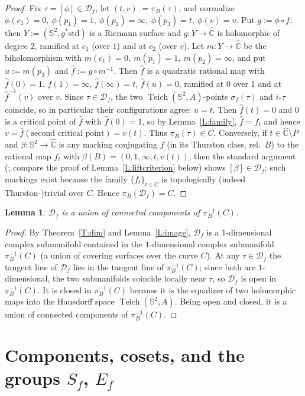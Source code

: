 \documentclass[11pt]{amsart}
\newtheorem{lemma}[theorem]{Lemma}
\newcommand{\Sph}{\mathbb{S}^{2}}
\newcommand{\Cpt}{\widehat{\mathbb{C}}}
\newcommand{\Teich}{\operatorname{Teich}}
\newcommand{\Def}{\mathcal{D}}
\begin{document}
\begin{proof}
Fix $\tau=[\phi]\in\Def_f$, let $(t,v):=\pi_B(\tau)$, and normalize
$\phi(c_1)=0,\ \phi(p_1)=1,\ \phi(p_2)=\infty,\ \phi(p_3)=t,\
\phi(v)=v$. Put $g:=\phi\circ f$; then $Y:=(\Sph,g^*\text{std})$ is a
Riemann surface and $g:Y\to\Cpt$ is holomorphic of degree $2$, ramified at
$c_1$ (over $1$) and at $c_2$ (over $v$). Let $m:Y\to\Cpt$ be the
biholomorphism with $m(c_1)=0,\ m(p_1)=1,\ m(p_2)=\infty$, and put
$u:=m(p_3)$ and $\hat f:=g\circ m^{-1}$. Then $\hat f$ is a quadratic
rational map with $\hat f(0)=1$, $\hat f(1)=\infty$, $\hat f(\infty)=t$,
$\hat f(u)=0$, ramified at $0$ over $1$ and at
$\hat f^{-1}(v)$ over $v$. Since $\tau\in\Def_f$, the two
$\Teich(\Sph,A)$-points $\sigma_f(\tau)$ and $i_*\tau$ coincide, so in
particular their configurations agree: $u=t$. Then $\hat f(t)=0$ and $0$
is a critical point of $\hat f$ with $\hat f(0)=1$, so by
Lemma~\ref{L:family}, $\hat f=f_t$ and hence
$v=\hat f(\text{second critical point})=v(t)$. Thus
$\pi_B(\tau)\in C$. Conversely, if $t\in\Cpt\setminus P$ and $\beta:
\Sph\to\Cpt$ is any marking conjugating $f$ (in its Thurston class, rel.\
$B$) to the rational map $f_t$ with $\beta(B)=(0,1,\infty,t,v(t))$,
then the standard argument
(\cite{Epstein}; compare the proof of Lemma~\ref{L:liftcriterion} below)
shows $[\beta]\in\Def_f$; such markings exist because the family
$\{f_t\}_{t\in C}$ is topologically (indeed Thurston-)trivial over $C$.
Hence $\pi_B(\Def_f)=C$.
\end{proof}

\begin{lemma}\label{L:open}
$\Def_f$ is a union of connected components of
$\pi_B^{-1}(C)$.
\end{lemma}

\begin{proof}
By Theorem~\ref{T:dim} and Lemma~\ref{L:image}, $\Def_f$ is a
$1$-dimensional complex submanifold contained in the $1$-dimensional
complex submanifold $\pi_B^{-1}(C)$ (a union of covering surfaces over the
curve $C$). At any $\tau\in\Def_f$ the tangent line of $\Def_f$ lies in the
tangent line of $\pi_B^{-1}(C)$; since both are $1$-dimensional, the two
submanifolds coincide locally near $\tau$, so $\Def_f$ is open in
$\pi_B^{-1}(C)$. It is closed in $\pi_B^{-1}(C)$ because it is the
equalizer of two holomorphic maps into the Hausdorff space
$\Teich(\Sph,A)$. Being open and closed, it is a union of connected
components of $\pi_B^{-1}(C)$.
\end{proof}

\section{Components, cosets, and the groups $S_f$, $E_f$}\label{S:cosets}
\end{document}
